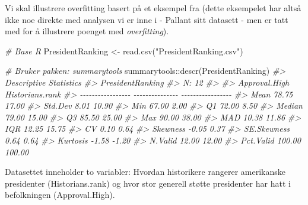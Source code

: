 \documentclass[
]{article}
\newenvironment{Shaded}{\begin{snugshade}}{\end{snugshade}}
\newcommand{\CommentTok}[1]{\textcolor[rgb]{0.56,0.35,0.01}{\textit{#1}}}
\newcommand{\FunctionTok}[1]{\textcolor[rgb]{0.00,0.00,0.00}{#1}}
\newcommand{\NormalTok}[1]{#1}
\newcommand{\OtherTok}[1]{\textcolor[rgb]{0.56,0.35,0.01}{#1}}
\newcommand{\SpecialCharTok}[1]{\textcolor[rgb]{0.00,0.00,0.00}{#1}}
\newcommand{\StringTok}[1]{\textcolor[rgb]{0.31,0.60,0.02}{#1}}
\begin{document}
Vi skal illustrere overfitting basert på et eksempel fra \citet{frostHowInterpretAdjusted2022} (dette eksempelet har altså ikke noe direkte med analysen vi er inne i - Pallant sitt datasett - men er tatt med for å illustrere poenget med \emph{overfitting}).

\begin{Shaded}
\begin{Highlighting}[]
\CommentTok{\# Base R}
\NormalTok{PresidentRanking }\OtherTok{\textless{}{-}} \FunctionTok{read.csv}\NormalTok{(}\StringTok{"PresidentRanking.csv"}\NormalTok{)}

\CommentTok{\# Bruker pakken: summarytools}
\NormalTok{summarytools}\SpecialCharTok{::}\FunctionTok{descr}\NormalTok{(PresidentRanking)}
\CommentTok{\#\textgreater{} Descriptive Statistics  }
\CommentTok{\#\textgreater{} PresidentRanking  }
\CommentTok{\#\textgreater{} N: 12  }
\CommentTok{\#\textgreater{} }
\CommentTok{\#\textgreater{}                     Approval.High   Historians.rank}
\CommentTok{\#\textgreater{} {-}{-}{-}{-}{-}{-}{-}{-}{-}{-}{-}{-}{-}{-}{-}{-}{-} {-}{-}{-}{-}{-}{-}{-}{-}{-}{-}{-}{-}{-}{-}{-} {-}{-}{-}{-}{-}{-}{-}{-}{-}{-}{-}{-}{-}{-}{-}{-}{-}}
\CommentTok{\#\textgreater{}              Mean           78.75             17.00}
\CommentTok{\#\textgreater{}           Std.Dev            8.01             10.90}
\CommentTok{\#\textgreater{}               Min           67.00              2.00}
\CommentTok{\#\textgreater{}                Q1           72.00              8.50}
\CommentTok{\#\textgreater{}            Median           79.00             15.00}
\CommentTok{\#\textgreater{}                Q3           85.50             25.00}
\CommentTok{\#\textgreater{}               Max           90.00             38.00}
\CommentTok{\#\textgreater{}               MAD           10.38             11.86}
\CommentTok{\#\textgreater{}               IQR           12.25             15.75}
\CommentTok{\#\textgreater{}                CV            0.10              0.64}
\CommentTok{\#\textgreater{}          Skewness           {-}0.05              0.37}
\CommentTok{\#\textgreater{}       SE.Skewness            0.64              0.64}
\CommentTok{\#\textgreater{}          Kurtosis           {-}1.58             {-}1.20}
\CommentTok{\#\textgreater{}           N.Valid           12.00             12.00}
\CommentTok{\#\textgreater{}         Pct.Valid          100.00            100.00}
\end{Highlighting}
\end{Shaded}

Datasettet inneholder to variabler: Hvordan historikere rangerer amerikanske presidenter (Historians.rank) og hvor stor generell støtte presidenter har hatt i befolkningen (Approval.High).
\end{document}
